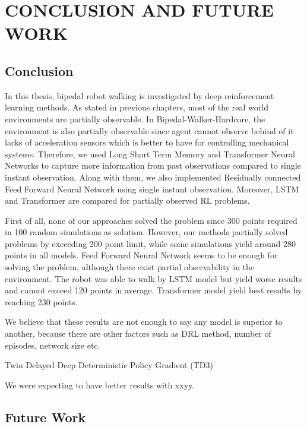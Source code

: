 \chapter{CONCLUSION AND FUTURE WORK}
\label{chap:conclusion}

\section{Conclusion}

In this thesis, bipedal robot walking is investigated by deep  reinforcement learning methods. As stated in previous chapters, most of the real world environments are partially observable. In Bipedal-Walker-Hardcore, the environment is also partially observable since agent cannot observe behind of it lacks of acceleration sensors which is better to have for controlling mechanical systems. Therefore, we used Long Short Term Memory and Transformer Neural Networks to capture more information from past observations compared to single instant observation. Along with them, we also implemented Residually connected Feed Forward Neural Network using single instant observation. Moreover, LSTM and Transformer are compared for partially observed RL problems. 

First of all, none of our approaches solved the problem since 300 points required in 100 random simulations as solution. However, our methods partially solved problems by exceeding 200 point limit, while some simulations yield around 280 points in all models. Feed Forward Neural Network seems to be enough for solving the problem, although there exist partial observability in the environment. The robot was able to walk by LSTM model but yield worse results and cannot exceed 120 points in average. Transformer model yield best results by reaching 230 points. 

We believe that these results are not enough to say any model is superior to another, because there are other factors such as DRL method, number of episodes, network size etc. 

Twin Delayed Deep Deterministic Policy Gradient (TD3) 

We were expecting to have better results with xxyy.

\section{Future Work}

